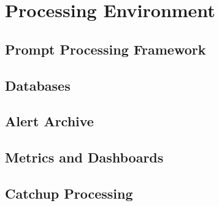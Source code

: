 \section{Processing Environment}


\subsection{Prompt Processing Framework}

\subsection{Databases}

\subsection{Alert Archive}

\subsection{Metrics and Dashboards}

\subsection{Catchup Processing}
